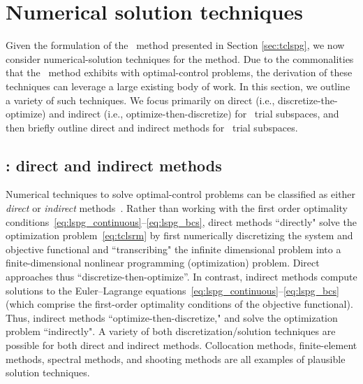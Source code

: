 \section{Numerical solution techniques}\label{sec:numerical_techniques}
Given the formulation of the \methodAcronym\ method presented in Section
\ref{sec:tclspg}, we now consider numerical-solution techniques for the method. 
Due to the commonalities that the \methodAcronym\ method exhibits with
optimal-control problems,  the derivation of these techniques can leverage a large existing
body of work. In this section, we outline a variety of such techniques. We
focus primarily on 
direct (i.e., discretize-the-optimize) and indirect (i.e., optimize-then-discretize) for \spatialAcronym\ trial subspaces, 
and then briefly outline direct and indirect methods for \spaceTimeAcronym\ trial subspaces. 

\subsection{\spatialAcronym: direct and indirect methods}
Numerical techniques to
solve optimal-control problems can be classified as either
\textit{direct} or \textit{indirect}
methods~\cite{conway_optimalcontrolreview}. Rather than working with the first order optimality conditions~\eqref{eq:lspg_continuous}--\eqref{eq:lspg_bcs}, direct methods ``directly" solve the optimization problem~\eqref{eq:tclsrm} by first
numerically discretizing the system and objective functional and ``transcribing"
the infinite dimensional problem into a finite-dimensional nonlinear
programming (optimization) problem. Direct approaches thus
``discretize-then-optimize''.
In contrast, indirect methods compute solutions to the Euler--Lagrange equations~\eqref{eq:lspg_continuous}--\eqref{eq:lspg_bcs} (which comprise the first-order optimality conditions of the objective functional). Thus, indirect methods ``optimize-then-discretize," and solve the optimization problem
``indirectly". A variety of both discretization/solution  techniques are possible
for both direct and indirect methods. Collocation methods,
finite-element methods, spectral methods, and shooting methods are all examples of
plausible solution techniques.  


